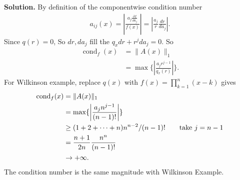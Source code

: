 \documentclass[a4paper]{book}
\newenvironment{solution}%
{\noindent\textbf{Solution.}}%
{\qedhere}
\numberwithin{equation}{chapter}
\theoremstyle{definition}
\begin{document}
\begin{solution}
  By definition of the componentwise condition number
  \begin{align*}
    a_{ij}(x) = \left| \frac{a_j\frac{\partial f}{\partial a_j}}{f(x)} \right| = \left| \frac{a_j}{r}\frac{dr}{da_j} \right|.
  \end{align*}
  Since $q(r) = 0$, So $dr,da_j$ fill the $q_x dr + r^j da_j = 0$. So
  \begin{align*}
    \operatorname{cond}_f(x) &= \lVert A(x) \rVert_1 \\
    &=\max \{\left| \frac{a_j r^{j-1}}{q_x(r)} \right|\} .
  \end{align*}
  For Wilkinson example, replace $q(x)$ with $f(x) = \prod_{k =1}^n(x - k)$ gives
  \begin{align*}
    \operatorname{cond}_f(x) &= \lVert A(x) \rVert_1 \\
                             &= \max \{\left| \frac{a_j n^{j-1}}{(n-1)!} \right|\} \\
                             & \geq (1 + 2 + \cdots +n) n^{n-2}/ (n-1)! \qquad \textmd{take } j = n-1 \\
    &= \frac{n+1}{2n} \frac{n^n}{(n-1)!}\\
    &\rightarrow +\infty.
  \end{align*}
  The condition number is the same magnitude with Wilkinson Example.
\end{solution}

%   

%   

%   


\end{document}
